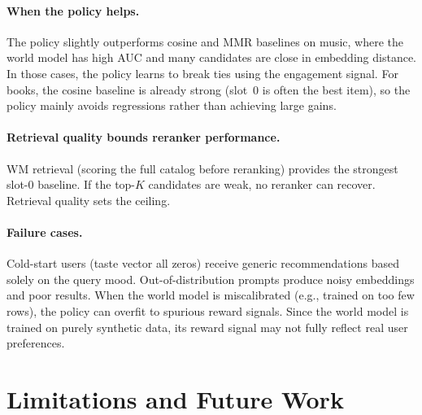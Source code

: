 \documentclass[11pt]{article}
\begin{document}
\paragraph{When the policy helps.}
The policy slightly outperforms cosine and MMR baselines on music, where
the world model has high AUC and many candidates are close in embedding
distance. In those cases, the policy learns to break ties using the
engagement signal. For books, the cosine baseline is already strong
(slot~0 is often the best item), so the policy mainly avoids regressions
rather than achieving large gains.

\paragraph{Retrieval quality bounds reranker performance.}
WM retrieval (scoring the full catalog before reranking) provides the
strongest slot-0 baseline. If the top-$K$ candidates are weak, no
reranker can recover. Retrieval quality sets the ceiling.

\paragraph{Failure cases.}
Cold-start users (taste vector all zeros) receive generic recommendations
based solely on the query mood. Out-of-distribution prompts produce noisy
embeddings and poor results. When the world model is miscalibrated
(e.g., trained on too few rows), the policy can overfit to spurious
reward signals. Since the world model is trained on purely synthetic data,
its reward signal may not fully reflect real user preferences.

\section{Limitations and Future Work}
\label{sec:limitations}
\end{document}
